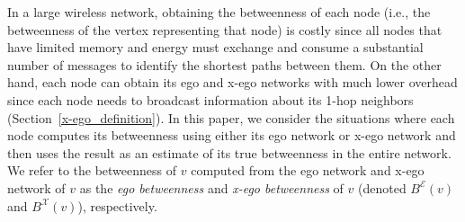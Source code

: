 \documentclass[journal]{IEEEtran}
\newcommand{\B}[1]{B({#1})}
\newcommand{\BE}[1]{B^{\mathcal{E}}({#1})}
\newcommand{\BX}[1]{B^{\mathcal{X}}({#1})}
\theoremstyle{definition}
\begin{document}
In a large wireless network, obtaining the betweenness of each node (i.e., the betweenness of the vertex representing that node) is costly since  all nodes that have limited memory and energy must exchange and consume a substantial number of messages to identify the shortest paths between them.
On the other hand, each node can obtain its ego and x-ego networks with much lower overhead since each node  needs to broadcast information about its 1-hop neighbors (Section~\ref{x-ego_definition}). 
In this paper, we consider the situations where each node computes its betweenness using either its ego network or x-ego network and then uses the result as an estimate of its true betweenness in the entire network.
We refer to the betweenness of $v$ computed from the ego network and x-ego network of $v$ as the {\em ego betweenness} and {\em x-ego betweenness} of $v$ (denoted $\BE{v}$ and $\BX{v}$), respectively.


\end{document}

